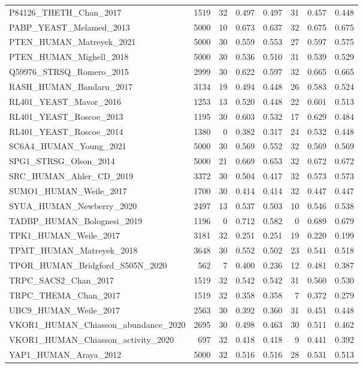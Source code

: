 \documentclass[11pt,a4paper]{article}
\begin{document}
\begin{table}[H]
\begin{tabular}{lrrrrrrr}
P84126\_THETH\_Chan\_2017 & 1519 & 32 & 0.497 & 0.497 & 31 & 0.457 & 0.448 \\
PABP\_YEAST\_Melamed\_2013 & 5000 & 10 & 0.673 & 0.637 & 32 & 0.675 & 0.675 \\
PTEN\_HUMAN\_Matreyek\_2021 & 5000 & 30 & 0.559 & 0.553 & 27 & 0.597 & 0.575 \\
PTEN\_HUMAN\_Mighell\_2018 & 5000 & 30 & 0.536 & 0.510 & 31 & 0.539 & 0.529 \\
Q59976\_STRSQ\_Romero\_2015 & 2999 & 30 & 0.622 & 0.597 & 32 & 0.665 & 0.665 \\
RASH\_HUMAN\_Bandaru\_2017 & 3134 & 19 & 0.494 & 0.448 & 26 & 0.583 & 0.524 \\
RL401\_YEAST\_Mavor\_2016 & 1253 & 13 & 0.520 & 0.448 & 22 & 0.601 & 0.513 \\
RL401\_YEAST\_Roscoe\_2013 & 1195 & 30 & 0.603 & 0.532 & 17 & 0.629 & 0.484 \\
RL401\_YEAST\_Roscoe\_2014 & 1380 & 0 & 0.382 & 0.317 & 24 & 0.532 & 0.448 \\
SC6A4\_HUMAN\_Young\_2021 & 5000 & 30 & 0.569 & 0.552 & 32 & 0.569 & 0.569 \\
SPG1\_STRSG\_Olson\_2014 & 5000 & 21 & 0.669 & 0.653 & 32 & 0.672 & 0.672 \\
SRC\_HUMAN\_Ahler\_CD\_2019 & 3372 & 30 & 0.504 & 0.417 & 32 & 0.573 & 0.573 \\
SUMO1\_HUMAN\_Weile\_2017 & 1700 & 30 & 0.414 & 0.414 & 32 & 0.447 & 0.447 \\
SYUA\_HUMAN\_Newberry\_2020 & 2497 & 13 & 0.537 & 0.503 & 10 & 0.546 & 0.538 \\
TADBP\_HUMAN\_Bolognesi\_2019 & 1196 & 0 & 0.712 & 0.582 & 0 & 0.689 & 0.679 \\
TPK1\_HUMAN\_Weile\_2017 & 3181 & 32 & 0.251 & 0.251 & 19 & 0.220 & 0.199 \\
TPMT\_HUMAN\_Matreyek\_2018 & 3648 & 30 & 0.552 & 0.502 & 23 & 0.541 & 0.518 \\
TPOR\_HUMAN\_Bridgford\_S505N\_2020 & 562 & 7 & 0.400 & 0.236 & 12 & 0.481 & 0.387 \\
TRPC\_SACS2\_Chan\_2017 & 1519 & 32 & 0.542 & 0.542 & 31 & 0.560 & 0.530 \\
TRPC\_THEMA\_Chan\_2017 & 1519 & 32 & 0.358 & 0.358 & 7 & 0.372 & 0.279 \\
UBC9\_HUMAN\_Weile\_2017 & 2563 & 30 & 0.392 & 0.360 & 31 & 0.451 & 0.448 \\
VKOR1\_HUMAN\_Chiasson\_abundance\_2020 & 2695 & 30 & 0.498 & 0.463 & 30 & 0.511 & 0.462 \\
VKOR1\_HUMAN\_Chiasson\_activity\_2020 & 697 & 32 & 0.418 & 0.418 & 9 & 0.441 & 0.392 \\
YAP1\_HUMAN\_Araya\_2012 & 5000 & 32 & 0.516 & 0.516 & 28 & 0.531 & 0.513 \\
\bottomrule
\end{tabular}
\end{table}
\end{document}
